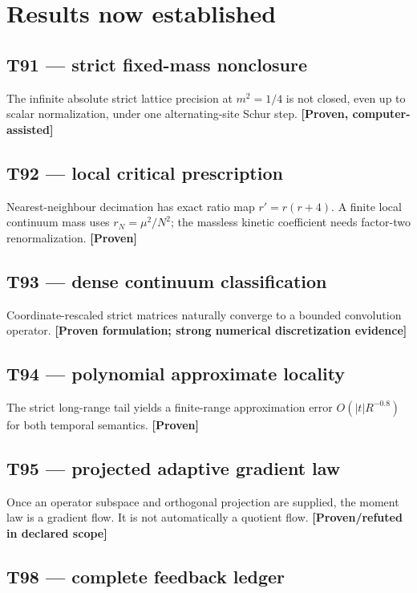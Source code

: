 \documentclass[11pt,a4paper,openany]{report}
\newcommand{\statusProven}{\textcolor{fingreen}{[Proven]}}
\newcommand{\statusComputer}{\textcolor{fingreen}{[Proven, computer-assisted]}}
\begin{document}
\section{Results now established}

\subsection{T91 --- strict fixed-mass nonclosure}

The infinite absolute strict lattice precision at \(m^2=1/4\) is not closed, even up to scalar normalization, under one alternating-site Schur step. \textbf{\statusComputer{}}

\subsection{T92 --- local critical prescription}

Nearest-neighbour decimation has exact ratio map \(r'=r(r+4)\). A finite local continuum mass uses \(r_N=\mu^2/N^2\); the massless kinetic coefficient needs factor-two renormalization. \textbf{\statusProven{}}

\subsection{T93 --- dense continuum classification}

Coordinate-rescaled strict matrices naturally converge to a bounded convolution operator. \textbf{[Proven formulation; strong numerical discretization evidence]}

\subsection{T94 --- polynomial approximate locality}

The strict long-range tail yields a finite-range approximation error \(O(|t|R^{-0.8})\) for both temporal semantics. \textbf{\statusProven{}}

\subsection{T95 --- projected adaptive gradient law}

Once an operator subspace and orthogonal projection are supplied, the moment law is a gradient flow. It is not automatically a quotient flow. \textbf{[Proven/\allowbreak{}refuted in declared scope]}

\subsection{T98 --- complete feedback ledger}
\end{document}
